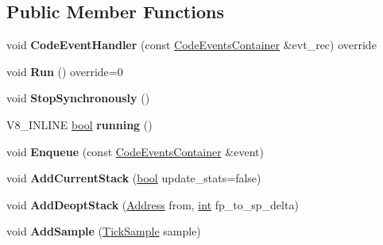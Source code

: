 \subsection*{Public Member Functions}
\begin{DoxyCompactItemize}
\item 
\mbox{\label{classv8_1_1internal_1_1ProfilerEventsProcessor_a6a62c345042e2d8386a2015f099c38b4}} 
void {\bfseries Code\+Event\+Handler} (const \mbox{\hyperlink{classv8_1_1internal_1_1CodeEventsContainer}{Code\+Events\+Container}} \&evt\+\_\+rec) override
\item 
\mbox{\label{classv8_1_1internal_1_1ProfilerEventsProcessor_a08492c0959468e981dd075e850e217be}} 
void {\bfseries Run} () override=0
\item 
\mbox{\label{classv8_1_1internal_1_1ProfilerEventsProcessor_a2c5ebee64884e9de0ca8edac68c91f5b}} 
void {\bfseries Stop\+Synchronously} ()
\item 
\mbox{\label{classv8_1_1internal_1_1ProfilerEventsProcessor_ad26d2ddb70435d480657732bf8eccba7}} 
V8\+\_\+\+I\+N\+L\+I\+NE \mbox{\hyperlink{classbool}{bool}} {\bfseries running} ()
\item 
\mbox{\label{classv8_1_1internal_1_1ProfilerEventsProcessor_a86cc7e6c442f57a7a545805a6cd5fecf}} 
void {\bfseries Enqueue} (const \mbox{\hyperlink{classv8_1_1internal_1_1CodeEventsContainer}{Code\+Events\+Container}} \&event)
\item 
\mbox{\label{classv8_1_1internal_1_1ProfilerEventsProcessor_a420f446157fee53fc5ac28fd5b88828c}} 
void {\bfseries Add\+Current\+Stack} (\mbox{\hyperlink{classbool}{bool}} update\+\_\+stats=false)
\item 
\mbox{\label{classv8_1_1internal_1_1ProfilerEventsProcessor_af9cd823141426c9a3083bcc1d7e5a351}} 
void {\bfseries Add\+Deopt\+Stack} (\mbox{\hyperlink{classuintptr__t}{Address}} from, \mbox{\hyperlink{classint}{int}} fp\+\_\+to\+\_\+sp\+\_\+delta)
\item 
\mbox{\label{classv8_1_1internal_1_1ProfilerEventsProcessor_a514ea4217b0d50c5ff46c83eda42c413}} 
void {\bfseries Add\+Sample} (\mbox{\hyperlink{structv8_1_1internal_1_1TickSample}{Tick\+Sample}} sample)
\end{DoxyCompactItemize}
